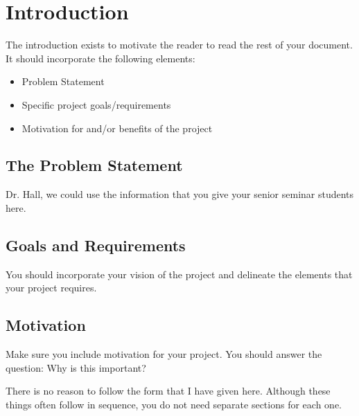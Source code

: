 \documentclass[ms,twoside,print]{nuthesis}
\begin{document}

\tableofcontents
\listoffigures
\listoftables

\mainmatter

\chapter{Introduction}\label{chap:introduction}

The introduction exists to motivate the reader to read the rest of your document. It should incorporate the following elements:

\begin{itemize}
  \item Problem Statement
  \item Specific project goals/requirements
  \item Motivation for and/or benefits of the project
\end{itemize}

\section{The Problem Statement}

Dr. Hall, we could use the information that you give your senior seminar students here. 

\section{Goals and Requirements}

You should incorporate your vision of the project and delineate the elements that your project requires.

\section{Motivation}

Make sure you include motivation for your project. You should answer the question: Why is this important?

There is no reason to follow the form that I have given here. Although these things often follow in sequence, you do not need separate sections for each one. 
\end{document}
